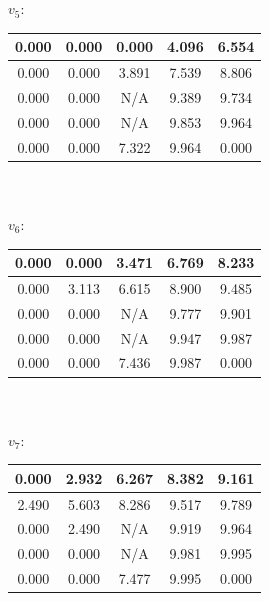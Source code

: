 \documentclass{article}
\begin{document}
\begin{enumerate}
\begin{tabular}{|c|c|c|c|c|}
\end{tabular} \\\\

$v_5$:

 \begin{tabular}{|c|c|c|c|c|}

     \hline
      0.000 & 0.000 & 0.000 & 4.096 & 6.554  \\
    \hline
    0.000 & 0.000 & 3.891 & 7.539 & 8.806  \\
    \hline
     0.000 & 0.000 &  N/A & 9.389 & 9.734  \\
    \hline
     0.000 & 0.000 &  N/A & 9.853 & 9.964  \\
    \hline
    0.000 & 0.000 & 7.322 & 9.964 & 0.000  \\
    \hline

\end{tabular} \\\\

$v_6$:

 \begin{tabular}{|c|c|c|c|c|}

     \hline
      0.000 & 0.000 & 3.471 & 6.769 & 8.233  \\
    \hline
    0.000 & 3.113 & 6.615 & 8.900 & 9.485  \\
    \hline
     0.000 & 0.000 &  N/A & 9.777 & 9.901  \\
    \hline
     0.000 & 0.000 &  N/A & 9.947 & 9.987  \\
    \hline
    0.000 & 0.000 & 7.436 & 9.987 & 0.000  \\
    \hline

\end{tabular} \\\\

$v_7$:

 \begin{tabular}{|c|c|c|c|c|}

     \hline
      0.000 & 2.932 & 6.267 & 8.382 & 9.161  \\
    \hline
    2.490 & 5.603 & 8.286 & 9.517 & 9.789  \\
    \hline
     0.000 & 2.490 &  N/A & 9.919 & 9.964  \\
    \hline
     0.000 & 0.000 &  N/A & 9.981 & 9.995  \\
    \hline
    0.000 & 0.000 & 7.477 & 9.995 & 0.000  \\
    \hline


\end{tabular}
\end{enumerate}
\end{document}
